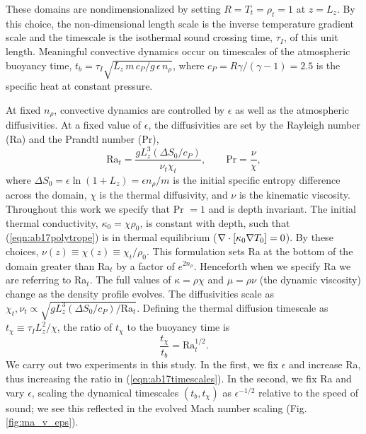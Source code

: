 These domains are nondimensionalized by setting $R = T_t = \rho_t = 1$ at $z = L_z$.
By this choice, the non-dimensional length scale is the inverse temperature gradient scale and the timescale is the isothermal sound crossing time, $\tau_I$, of this unit length.
Meaningful convective dynamics occur on timescales of the atmospheric buoyancy time, $t_b = \tau_I \sqrt{L_z\,m\,c_P/g\,\epsilon\,n_\rho}$, where $c_P = R \gamma/(\gamma-1) = 2.5$ is the specific heat at constant pressure.

At fixed $n_\rho$, convective dynamics are controlled by $\epsilon$ as well as the atmospheric diffusivities.
At a fixed value of $\epsilon$, the diffusivities are set by the Rayleigh number (Ra) and the Prandtl number (Pr),
\begin{equation}
\text{Ra}_{t} = \frac{g L_z^3 (\Delta S_0 / c_P)}{\nu_t\chi_t},
\qquad
\text{Pr} = \frac{\nu}{\chi},
\end{equation}
where $\Delta S_0 = \epsilon\ln (1 + L_z) = \epsilon n_\rho / m$ is the initial specific entropy difference across the domain, $\chi$ is the thermal diffusivity, and $\nu$ is the kinematic viscosity.
Throughout this work we specify that Pr $= 1$ and is depth invariant.
The initial thermal conductivity, $\kappa_0 = \chi \rho_0$, is constant with depth, such that (\ref{eqn:ab17polytrope}) is in thermal equilibrium ($\nabla\cdot[\kappa_0\nabla T_0] = 0$).
By these choices, $\nu(z) \equiv \chi(z) \equiv \chi_t / \rho_0$.
This formulation sets Ra at the bottom of the domain greater than Ra$_t$ by a factor of $e^{2n_\rho}$. 
Henceforth when we specify Ra we are referring to Ra$_t$.  
The full values of $\kappa = \rho\chi$ and $\mu = \rho\nu$ (the dynamic viscosity) change as the density profile evolves.  
The diffusivities scale as $\chi_t, \nu_t \propto \sqrt{g L_z^3 (\Delta S_0 / c_P) / \text{Ra}_t}$.
Defining the thermal diffusion timescale as $t_\chi \equiv \tau_IL_z^2 / \chi$, the ratio of $t_\chi$ to the buoyancy time is
\begin{equation}
\frac{t_\chi}{t_b} =\text{Ra}_t^{1/2}.
\label{eqn:ab17timescales}
\end{equation}
We carry out two experiments in this study. 
In the first, we fix $\epsilon$ and increase Ra, thus increasing the ratio in (\ref{eqn:ab17timescales}). 
In the second, we fix Ra and vary $\epsilon$, scaling the dynamical timescales $(t_b, t_\chi)$ as $\epsilon^{-1/2}$ relative to the speed of sound; we see this reflected in the evolved Mach number scaling (Fig. \ref{fig:ma_v_eps}).

